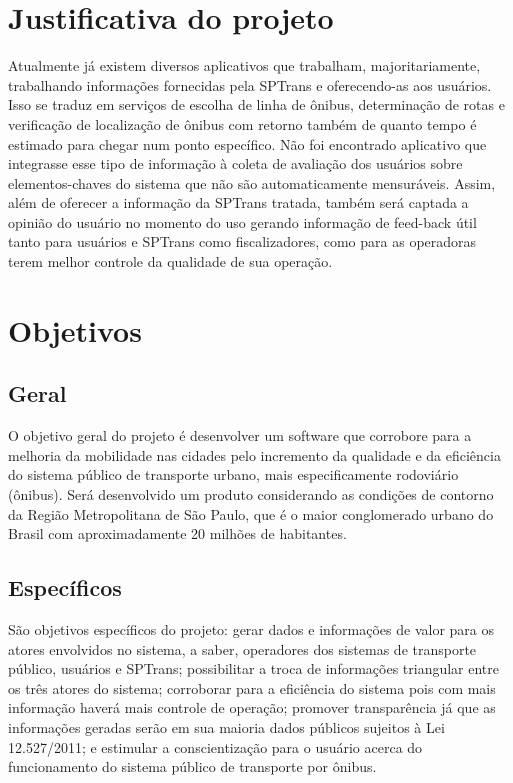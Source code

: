 \section{Justificativa do projeto}\label{sec:justificativa}
	Atualmente já existem diversos aplicativos que trabalham, majoritariamente, trabalhando informações fornecidas pela SPTrans e oferecendo-as aos usuários. Isso se traduz em serviços de escolha de linha de ônibus, determinação de rotas e verificação de localização de ônibus com retorno também de quanto tempo é estimado para chegar num ponto específico. Não foi encontrado aplicativo que integrasse esse tipo de informação à coleta de avaliação dos usuários sobre elementos-chaves do sistema que não são automaticamente mensuráveis. Assim, além de oferecer a informação da SPTrans tratada, também será captada a opinião do usuário no momento do uso gerando informação de feed-back útil tanto para usuários e SPTrans como fiscalizadores, como para as operadoras terem melhor controle da qualidade de sua operação.

%

\section{Objetivos}\label{sec:objetivos}

\subsection{Geral}\label{subsec:objGerais}
O objetivo geral do projeto é desenvolver um software que corrobore para a melhoria da mobilidade nas cidades pelo incremento da qualidade e da eficiência do sistema público de transporte urbano, mais especificamente rodoviário (ônibus). Será desenvolvido um produto considerando as condições de contorno da Região Metropolitana de São Paulo, que é o maior conglomerado urbano do Brasil com aproximadamente 20 milhões de habitantes. 

\subsection{Específicos}\label{subsec:objEspec}
São objetivos específicos do projeto: gerar dados e informações de valor para os atores envolvidos no sistema, a saber, operadores dos sistemas de transporte público, usuários e SPTrans; possibilitar a troca de informações triangular entre os três atores do sistema; corroborar para a eficiência do sistema pois com mais informação haverá mais controle de operação; promover transparência já que as informações geradas serão em sua maioria dados públicos sujeitos à Lei 12.527/2011; e estimular a conscientização para o usuário acerca do funcionamento do sistema público de transporte por ônibus.
	
